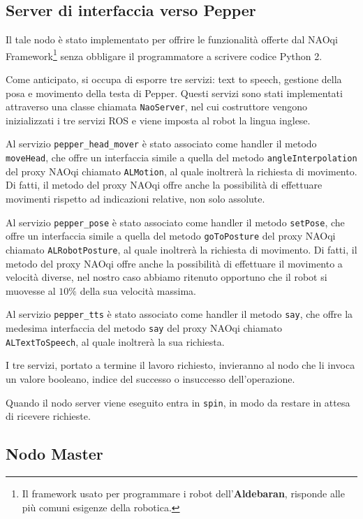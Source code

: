 \subsection{Server di interfaccia verso Pepper}

Il tale nodo è stato implementato per offrire le funzionalità offerte dal NAOqi Framework\footnote{Il framework usato per programmare i robot dell'\textbf{Aldebaran}, risponde alle più comuni esigenze della robotica.} senza obbligare il programmatore a scrivere codice Python 2.

Come anticipato, si occupa di esporre tre servizi: text to speech, gestione della posa e movimento della testa di Pepper. 
Questi servizi sono stati implementati attraverso una classe chiamata \verb|NaoServer|, nel cui costruttore vengono inizializzati i tre servizi ROS e viene imposta al robot la lingua inglese.

Al servizio \verb|pepper_head_mover| è stato associato come handler il metodo \verb|moveHead|, che offre un interfaccia simile a quella del metodo \verb|angleInterpolation| del proxy NAOqi chiamato \verb|ALMotion|, al quale inoltrerà la richiesta di movimento. Di fatti, il metodo del proxy NAOqi offre anche la possibilità di effettuare movimenti rispetto ad indicazioni relative, non solo assolute.

Al servizio \verb|pepper_pose| è stato associato come handler il metodo \verb|setPose|, che offre un interfaccia simile a quella del metodo \verb|goToPosture| del proxy NAOqi chiamato \verb|ALRobotPosture|, al quale inoltrerà la richiesta di movimento. Di fatti, il metodo del proxy NAOqi offre anche la possibilità di effettuare il movimento a velocità diverse, nel nostro caso abbiamo ritenuto opportuno che il robot si muovesse al $10\%$ della sua velocità massima.

Al servizio \verb|pepper_tts| è stato associato come handler il metodo \verb|say|, che offre la medesima interfaccia del metodo \verb|say| del proxy NAOqi chiamato \verb|ALTextToSpeech|, al quale inoltrerà la sua richiesta.

I tre servizi, portato a termine il lavoro richiesto, invieranno al nodo che li invoca un valore booleano, indice del successo o insuccesso dell'operazione.

Quando il nodo server viene eseguito entra in \verb|spin|, in modo da restare in attesa di ricevere richieste.

\subsection{Nodo Master}

